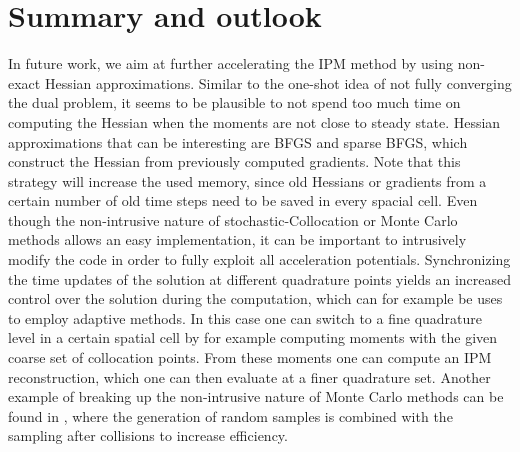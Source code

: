 \section{Summary and outlook}
\label{sec:summary_outlook}

In future work, we aim at further accelerating the IPM method by using non-exact Hessian approximations. Similar to the one-shot idea of not fully converging the dual problem, it seems to be plausible to not spend too much time on computing the Hessian when the moments are not close to steady state. Hessian approximations that can be interesting are BFGS and sparse BFGS, which construct the Hessian from previously computed gradients. Note that this strategy will increase the used memory, since old Hessians or gradients from a certain number of old time steps need to be saved in every spacial cell.
Even though the non-intrusive nature of stochastic-Collocation or Monte Carlo methods allows an easy implementation, it can be important to intrusively modify the code in order to fully exploit all acceleration potentials. Synchronizing the time updates of the solution at different quadrature points yields an increased control over the solution during the computation, which can for example be uses to employ adaptive methods. In this case one can switch to a fine quadrature level in a certain spatial cell by for example computing moments with the given coarse set of collocation points. From these moments one can compute an IPM reconstruction, which one can then evaluate at a finer quadrature set. Another example of breaking up the non-intrusive nature of Monte Carlo methods can be found in \cite{poette2019gpc}, where the generation of random samples is combined with the sampling after collisions to increase efficiency.